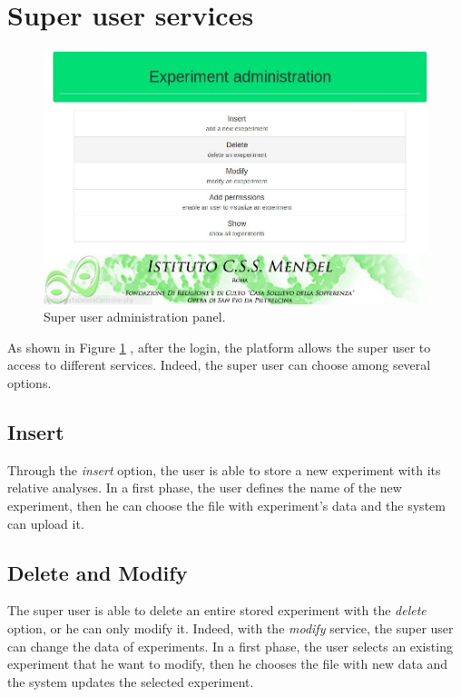 \documentclass[a4paper]{report}
\begin{document}
\section{Super user services}

\begin{figure}[htb] 
\begin{center}
\includegraphics[scale=0.4]{figure/SUservices.jpg} 
\end{center}
\caption{Super user administration panel.}
\label{SUservices}
\end{figure}

As shown in Figure \ref{SUservices} , after the login, the platform allows the super user to access to different services. Indeed, the super user can choose among several options.

\subsection{Insert}
Through the \emph{insert} option, the user is able to store a new experiment with its relative analyses. In a first phase, the user defines the name of the new experiment, then he can choose the file with experiment's data and the system can upload it. 

\subsection{Delete and Modify}
The super user is able to delete an entire stored experiment with the \emph{delete} option, or he can only modify it. Indeed, with the \emph{modify} service, the super user can change the data of experiments. In a first phase, the user selects an existing  experiment that he want to modify, then he chooses the file with new data and the system updates the selected experiment.
\end{document}
